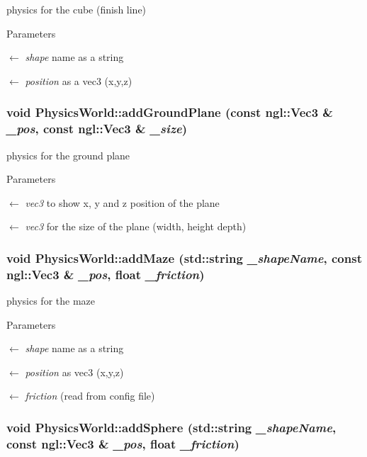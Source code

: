 physics for the cube (finish line) 
\begin{DoxyParams}{Parameters}
\item[\mbox{$\leftarrow$} {\em shape}]name as a string \item[\mbox{$\leftarrow$} {\em position}]as a vec3 (x,y,z) \end{DoxyParams}
\hypertarget{classPhysicsWorld_af3c1088adc3402dccd48098468805008}{
\subsubsection[{addGroundPlane}]{\setlength{\rightskip}{0pt plus 5cm}void PhysicsWorld::addGroundPlane (const ngl::Vec3 \& {\em \_\-pos}, \/  const ngl::Vec3 \& {\em \_\-size})}}
\label{classPhysicsWorld_af3c1088adc3402dccd48098468805008}


physics for the ground plane 
\begin{DoxyParams}{Parameters}
\item[\mbox{$\leftarrow$} {\em vec3}]to show x, y and z position of the plane \item[\mbox{$\leftarrow$} {\em vec3}]for the size of the plane (width, height depth) \end{DoxyParams}
\hypertarget{classPhysicsWorld_a18e222c2a3b752a4ca79534affc26677}{
\subsubsection[{addMaze}]{\setlength{\rightskip}{0pt plus 5cm}void PhysicsWorld::addMaze (std::string {\em \_\-shapeName}, \/  const ngl::Vec3 \& {\em \_\-pos}, \/  float {\em \_\-friction})}}
\label{classPhysicsWorld_a18e222c2a3b752a4ca79534affc26677}


physics for the maze 
\begin{DoxyParams}{Parameters}
\item[\mbox{$\leftarrow$} {\em shape}]name as a string \item[\mbox{$\leftarrow$} {\em position}]as vec3 (x,y,z) \item[\mbox{$\leftarrow$} {\em friction}](read from config file) \end{DoxyParams}
\hypertarget{classPhysicsWorld_ad5e2e567a83e27977fa57185640efea5}{
\subsubsection[{addSphere}]{\setlength{\rightskip}{0pt plus 5cm}void PhysicsWorld::addSphere (std::string {\em \_\-shapeName}, \/  const ngl::Vec3 \& {\em \_\-pos}, \/  float {\em \_\-friction})}}
\label{classPhysicsWorld_ad5e2e567a83e27977fa57185640efea5}


